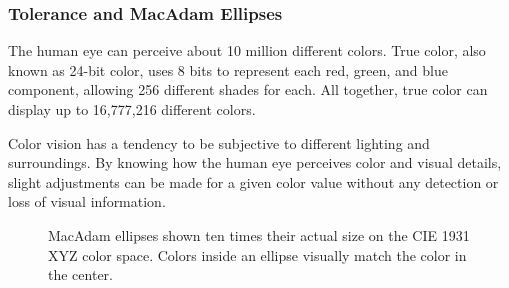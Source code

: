 \documentclass[12pt]{article}
\begin{document}
\subsubsection{Tolerance and MacAdam Ellipses}
The human eye can perceive about 10 million different colors. True color, also known as 24-bit color, uses 8 bits to represent each red, green, and blue component, allowing 256 different shades for each. All together, true color can display up to 16,777,216 different colors.

Color vision has a tendency to be subjective to different lighting and surroundings. By knowing how the human eye perceives color and visual details, slight adjustments can be made for a given color value without any detection or loss of visual information. \citep{MacAdam}

\begin{figure}[!htbp]
\begin{center}
\caption{MacAdam ellipses shown ten times their actual size on the CIE 1931 XYZ color space. Colors inside an ellipse visually match the color in the center.}
\end{center}
\end{figure}
\end{document}
